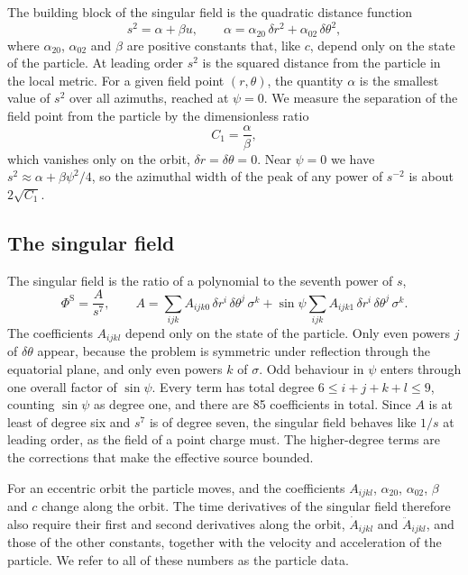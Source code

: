\documentclass[11pt]{article}
\newcommand{\PhiS}{\Phi^{\mathrm{S}}}
\begin{document}
The building block of the singular field is the quadratic distance function
\begin{equation}
  \label{eq:s2}
  s^2 = \alpha + \beta u, \qquad \alpha = \alpha_{20}\,\delta r^2 + \alpha_{02}\,\delta\theta^2,
\end{equation}
where $\alpha_{20}$, $\alpha_{02}$ and $\beta$ are positive constants that,
like $c$, depend only on the state of the particle. At leading order $s^2$ is
the squared distance from the particle in the local metric. For a given field
point $(r,\theta)$, the quantity $\alpha$ is the smallest value of $s^2$ over
all azimuths, reached at $\psi=0$. We measure the separation of the field point
from the particle by the dimensionless ratio
\begin{equation}
  \label{eq:C1}
  C_1 = \frac{\alpha}{\beta},
\end{equation}
which vanishes only on the orbit, $\delta r=\delta\theta=0$. Near $\psi=0$ we
have $s^2\approx\alpha+\beta\psi^2/4$, so the azimuthal width of the peak of
any power of $s^{-2}$ is about $2\sqrt{C_1}$.

\subsection{The singular field}

The singular field is the ratio of a polynomial to the seventh power of $s$,
\begin{equation}
  \label{eq:puncture}
  \PhiS = \frac{A}{s^7}, \qquad
  A = \sum_{ijk} A_{ijk0}\,\delta r^i\,\delta\theta^j\,\sigma^k
    + \sin\psi\sum_{ijk} A_{ijk1}\,\delta r^i\,\delta\theta^j\,\sigma^k .
\end{equation}
The coefficients $A_{ijkl}$ depend only on the state of the particle. Only even
powers $j$ of $\delta\theta$ appear, because the problem is symmetric under
reflection through the equatorial plane, and only even powers $k$ of $\sigma$.
Odd behaviour in $\psi$ enters through one overall factor of $\sin\psi$. Every term
has total degree $6\le i+j+k+l\le9$, counting $\sin\psi$ as degree one, and
there are 85 coefficients in total. Since $A$ is at least of degree six and
$s^7$ is of degree seven, the singular field behaves like $1/s$ at leading
order, as the field of a point charge must. The higher-degree terms are the
corrections that make the effective source bounded.

For an eccentric orbit the particle moves, and the coefficients $A_{ijkl}$,
$\alpha_{20}$, $\alpha_{02}$, $\beta$ and $c$ change along the orbit. The time
derivatives of the singular field therefore also require their first and second
derivatives along the orbit, $\dot A_{ijkl}$ and $\ddot A_{ijkl}$, and those of
the other constants, together with the velocity and acceleration of the
particle. We refer to all of these numbers as the particle data.
\end{document}
